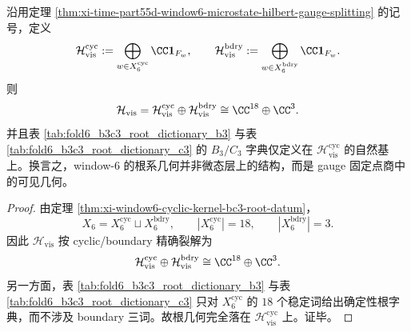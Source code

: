 \begin{corollary}\label{cor:xi-time-part55d-window6-root-geometry-visible-fixed-quotient}
沿用定理 \ref{thm:xi-time-part55d-window6-microstate-hilbert-gauge-splitting} 的记号，定义
\[
\mathcal H_{\mathrm{vis}}^{\mathrm{cyc}}
:=
\bigoplus_{w\in X_6^{\mathrm{cyc}}}\CC \mathbf 1_{F_w},
\qquad
\mathcal H_{\mathrm{vis}}^{\mathrm{bdry}}
:=
\bigoplus_{w\in X_6^{\mathrm{bdry}}}\CC \mathbf 1_{F_w}.
\]
则
\[
\mathcal H_{\mathrm{vis}}
=
\mathcal H_{\mathrm{vis}}^{\mathrm{cyc}}
\oplus
\mathcal H_{\mathrm{vis}}^{\mathrm{bdry}}
\cong
\CC^{18}\oplus \CC^3.
\]
并且表 \ref{tab:fold6_b3c3_root_dictionary_b3} 与表 \ref{tab:fold6_b3c3_root_dictionary_c3} 的 \(B_3/C_3\) 字典仅定义在 \(\mathcal H_{\mathrm{vis}}^{\mathrm{cyc}}\) 的自然基上。换言之，window-\(6\) 的根系几何并非微态层上的结构，而是 gauge 固定点商中的可见几何。
\end{corollary}
\begin{proof}
由定理 \ref{thm:xi-window6-cyclic-kernel-bc3-root-datum}，
\[
X_6=X_6^{\mathrm{cyc}}\sqcup X_6^{\mathrm{bdry}},
\qquad
|X_6^{\mathrm{cyc}}|=18,
\qquad
|X_6^{\mathrm{bdry}}|=3.
\]
因此 \(\mathcal H_{\mathrm{vis}}\) 按 cyclic/boundary 精确裂解为
\[
\mathcal H_{\mathrm{vis}}^{\mathrm{cyc}}\oplus \mathcal H_{\mathrm{vis}}^{\mathrm{bdry}}
\cong
\CC^{18}\oplus \CC^3.
\]
另一方面，表 \ref{tab:fold6_b3c3_root_dictionary_b3} 与表 \ref{tab:fold6_b3c3_root_dictionary_c3} 只对 \(X_6^{\mathrm{cyc}}\) 的 \(18\) 个稳定词给出确定性根字典，而不涉及 boundary 三词。故根几何完全落在 \(\mathcal H_{\mathrm{vis}}^{\mathrm{cyc}}\) 上。证毕。
\end{proof}

